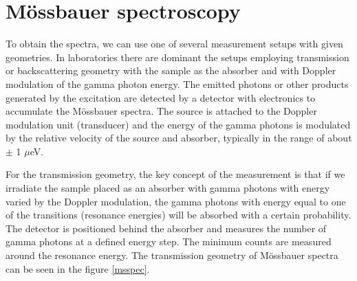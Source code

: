 \section{Mössbauer spectroscopy}
To obtain the spectra, we can use one of several measurement setups with given geometries. In laboratories there are dominant the setups employing transmission or backscattering geometry with the sample as the absorber and with Doppler modulation of the gamma photon energy. The emitted photons or other products generated by the excitation are detected by a detector with electronics to accumulate the Mössbauer spectra. The source is attached to the Doppler modulation unit (transducer) and the energy of the gamma photons is modulated by the relative velocity of the source and absorber, typically in the range of about $\pm$ 1 $\mu$eV.
\par
For the transmission geometry, the key concept of the measurement is that if we irradiate the sample placed as an absorber with gamma photons with energy varied by the Doppler modulation, the gamma photons with energy equal to one of the transitions (resonance energies) will be absorbed with a certain probability. The detector is positioned behind the absorber and measures the number of gamma photons at a defined energy step. The minimum counts are measured around the resonance energy. The transmission geometry of Mössbauer spectra can be seen in the figure \ref{msspec}.
